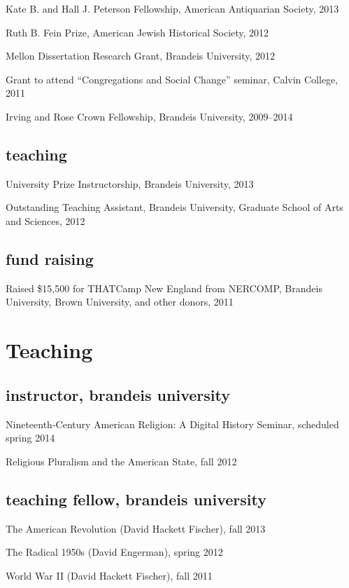 \documentclass[11pt]{article}
\begin{document}
Kate B. and Hall J. Peterson Fellowship, American Antiquarian Society, 2013

Ruth B. Fein Prize, American Jewish Historical Society, 2012

Mellon Dissertation Research Grant, Brandeis University, 2012

Grant to attend ``Congregations and Social Change'' seminar, Calvin 
College, 2011

Irving and Rose Crown Fellowship, Brandeis University, 2009--2014

\subsection{teaching}

University Prize Instructorship, Brandeis University, 2013

Outstanding Teaching Assistant, Brandeis University, Graduate School of 
Arts and Sciences, 2012

\subsection{fund raising}

Raised \$15,500 for THATCamp New England from NERCOMP, Brandeis 
University, Brown University, and other donors, 2011

\section{Teaching}

\subsection{instructor, brandeis university}

Nineteenth-Century American Religion: A Digital History Seminar, 
scheduled spring 2014

Religious Pluralism and the American State, fall 2012

\subsection{teaching fellow, brandeis university}

The American Revolution (David Hackett Fischer), fall 2013

The Radical 1950s (David Engerman), spring 2012

World War II (David Hackett Fischer), fall 2011
\end{document}
